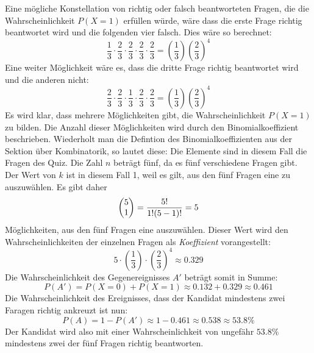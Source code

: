 Eine m\"{o}gliche Konstellation von richtig oder falsch beantworteten Fragen, die die Wahrscheinlichkeit $P(X = 1)$ erf\"{u}llen w\"{u}rde, w\"{a}re dass die erste Frage richtig beantwortet wird und die folgenden vier falsch. Dies w\"{a}re so berechnet: $$\frac{1}{3} \cdot \frac{2}{3} \cdot \frac{2}{3} \cdot \frac{2}{3} \cdot \frac{2}{3} = \left(\frac{1}{3}\right) \left(\frac{2}{3}\right)^4$$ Eine weiter M\"{o}glichkeit w\"{a}re es, dass die dritte Frage richtig beantwortet wird und die anderen nicht: $$\frac{2}{3} \cdot \frac{2}{3} \cdot \frac{1}{3} \cdot \frac{2}{3} \cdot \frac{2}{3} = \left(\frac{1}{3}\right) \left(\frac{2}{3}\right)^4$$ Es wird klar, dass mehrere M\"{o}glichkeiten gibt, die Wahrscheinlichkeit $P(X = 1)$ zu bilden. Die Anzahl dieser M\"{o}glichkeiten wird durch den Binomialkoeffizient beschrieben. Wiederholt man die Defintion des Binomialkoeffizienten aus der Sektion \"{u}ber Kombinatorik, so lautet diese:  Die Elemente sind in diesem Fall die Fragen des Quiz. Die Zahl $n$ betr\"{a}gt f\"{u}nf, da es f\"{u}nf verschiedene Fragen gibt. Der Wert von $k$ ist in diesem Fall 1, weil es gilt, aus den f\"{u}nf Fragen eine zu auszuw\"{a}hlen. Es gibt daher $$\begin{pmatrix}5 \\ 1\end{pmatrix} = \frac{5!}{1! (5 - 1)!} = 5$$ M\"{o}glichkeiten, aus den f\"{u}nf Fragen eine auszuw\"{a}hlen. Dieser Wert wird den Wahrscheinlichkeiten der einzelnen Fragen als \emph{Koeffizient} vorangestellt: $$5 \cdot \left(\frac{1}{3}\right) \cdot \left(\frac{2}{3}\right)^4 \approx 0.329$$ Die Wahrscheinlichkeit des Gegenereignisses $A'$ betr\"{a}gt somit in Summe: $$P(A') = P(X=0) + P(X=1) \approx 0.132 + 0.329 \approx 0.461$$ Die Wahrscheinlichkeit  des Ereignisses, dass der Kandidat mindestens zwei Faragen richtig ankreuzt ist nun: $$P(A) = 1 - P(A') \approx 1 - 0.461 \approx 0.538 \approx 53.8 \%$$ Der Kandidat wird also mit einer Wahrscheinlichkeit von ungef\"{a}hr $53.8\%$ mindestens zwei der f\"{u}nf Fragen richtig beantworten.

